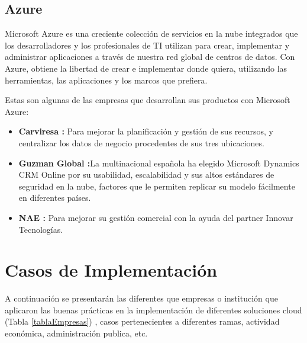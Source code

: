 \documentclass[a4paper, 12pt]{report}
\begin{document}
\subsection{Azure}
\begin{justify}
Microsoft Azure es una creciente colección de servicios en la nube integrados que los desarrolladores y los profesionales de TI utilizan para crear, implementar y administrar aplicaciones a través de nuestra red global de centros de datos. Con Azure, obtiene la libertad de crear e implementar donde quiera, utilizando las herramientas, las aplicaciones y los marcos que prefiera.\citep{azure_def}

Estas son algunas de las empresas que  desarrollan sus productos con Microsoft Azure:
\begin{itemize}
	\item \textbf{Carviresa :} Para mejorar la planificación y gestión de sus recursos, y centralizar los datos de negocio procedentes de sus tres ubicaciones.
	\item \textbf{Guzman Global :}La multinacional española ha elegido Microsoft Dynamics CRM Online por su usabilidad, escalabilidad y sus altos estándares de seguridad en la nube, factores que le permiten replicar su modelo fácilmente en diferentes países.
	\item \textbf{NAE :} Para mejorar su gestión comercial con la ayuda del partner Innovar Tecnologías.
\end{itemize}

\end{justify}
\newpage
\section{Casos de Implementación}
	\begin{justify}
	A continuación se presentarán  las diferentes que empresas o instituci\'on que aplicaron las buenas pr\'acticas en la implementaci\'on de diferentes soluciones cloud (Tabla \ref{tablaEmpresas}) , casos pertenecientes a diferentes ramas, actividad económica, administración publica, etc.
	\end{justify}
\end{document}

